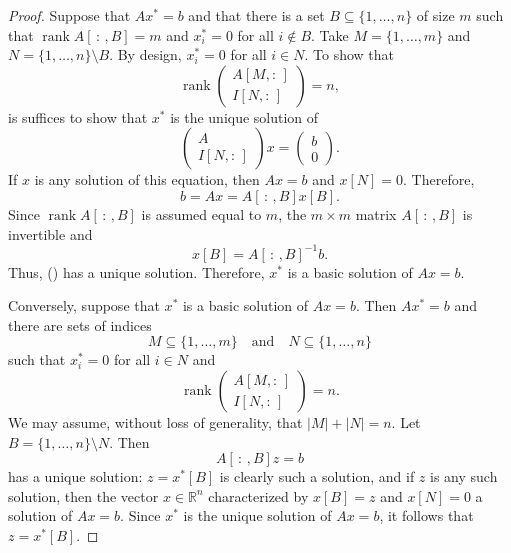 \documentclass[12pt]{amsart}
\theoremstyle{definition}
\theoremstyle{remark}
\numberwithin{equation}{section}
\newcommand{\RR}{\mathbb{R}}
\DeclareMathOperator{\rank}{rank}
\begin{document}
\begin{proof}
    Suppose that $Ax^*=b$ and that there is a set
    $B\subseteq\{1,\ldots,n\}$ of size $m$ such that
    $\rank A[\,:\,,B]=m$ and $x_i^*=0$ for all $i\notin B$.
    Take $M=\{1,\ldots,m\}$ and $N = \{1,\ldots,n\}\setminus B$.
    By design, $x_i^*=0$ for all $i\in N$.
    To show that
    \[
        \rank\begin{pmatrix}
            A[M,:\,]\\I[N,:\,]
        \end{pmatrix}=n,
    \]
    is suffices to show that $x^*$ is the unique solution of
    \[
        \begin{pmatrix}A\\I[N,:\,]\end{pmatrix}x
        =\begin{pmatrix}b\\0\end{pmatrix}.\tag{\dag}
    \]
    If $x$ is any solution of this equation, then $Ax=b$ and $x[N]=0$.
    Therefore,
    \[
        b = Ax = A[\,:\,,B]x[B].
    \]
    Since $\rank A[\,:\,,B]$ is assumed equal to $m$,
    the $m\times m$ matrix $A[\,:\,,B]$ is invertible and
    \[
        x[B] = A[\,:\,,B]^{-1}b.
    \]
    Thus, (\dag) has a unique solution.
    Therefore, $x^*$ is a basic solution of $Ax=b$.

    Conversely, suppose that $x^*$ is a basic solution of $Ax=b$.
    Then $Ax^*=b$ and there are sets of indices
    \[
        M\subseteq\{1,\ldots,m\}\quad\text{and}\quad
        N\subseteq\{1,\ldots,n\}
    \]
    such that $x_i^*=0$ for all $i\in N$ and
    \[
        \rank\begin{pmatrix}
            A[M,:\,]\\I[N,:\,]
        \end{pmatrix}=n.
    \]
    We may assume, without loss of generality, that $|M| + |N|=n$.
    Let $B=\{1,\ldots,n\}\setminus N$.
    Then
    \[
        A[\,:\,,B]z = b
    \]
    has a unique solution: $z=x^*[B]$ is clearly such a solution, and if $z$
    is any such solution, then the vector $x\in\RR^n$ characterized by $x[B]=z$
    and $x[N]=0$ a solution of $Ax=b$.
    Since $x^*$ is the unique solution of $Ax=b$, it follows that $z=x^*[B]$.

\end{proof}
\end{document}

